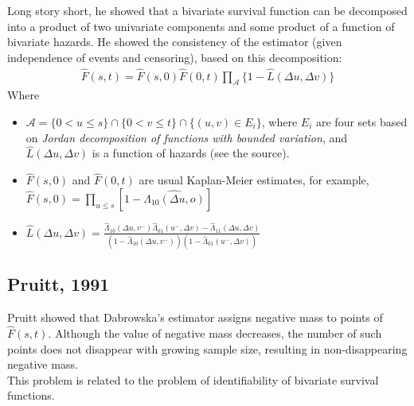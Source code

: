\documentclass[]{article}
\begin{document}
Long story short, he showed that a bivariate survival function can be decomposed into a product of two univariate components and some product of a function of bivariate hazards. He showed the consistency of the estimator (given independence of events and censoring), based on this decomposition:
	$$
	\begin{aligned}
		\hat{F}(s,t) = \hat{F}(s,0)\hat{F}(0,t)\prod_{\mathcal{A}}\{1 - \hat{L}(\Delta u, \Delta v)\}
	\end{aligned}
	$$
Where 
\begin{itemize}
	\item $\mathcal{A} = \{0<u\leq s\} \cap \{0 < v \leq t\} \cap \{(u, v) \in E_i\}$, where $E_i$ are four sets based on \emph{Jordan decomposition of functions with bounded variation}, and $\hat{L}(\Delta u, \Delta v)$ is a function of hazards (see the source).
  \item $\hat{F}(s,0)$ and $\hat{F}(0,t)$ are usual Kaplan-Meier estimates, for example, $\hat{F}(s,0) = \prod_{u\leq s}[1-\hat{\Lambda_{10}(\Delta u, o)}]$
	\item $\hat{L}(\Delta u, \Delta v) = \frac{\hat{\Lambda}_{10}(\Delta u,v^-)\hat{\Lambda}_{01}(u^-,\Delta v) - \hat{\Lambda}_{11}(\Delta u,\Delta v)}{\left(1-\hat{\Lambda}_{10}(\Delta u,v^-)\right)\left(1-\hat{\Lambda}_{01}(u^-,\Delta v)\right)}$
\end{itemize}

 \subsection{Pruitt, 1991 \cite{pruitt1991negative}}
 Pruitt showed that Dabrowska's estimator assigns negative mass to points of $\hat{F}(s,t)$. Although the value of negative mass decreases, the number of such points does not disappear with growing sample size, resulting in non-disappearing negative mass.\\
This problem is related to the problem of identifiability of bivariate survival functions.
\end{document}
